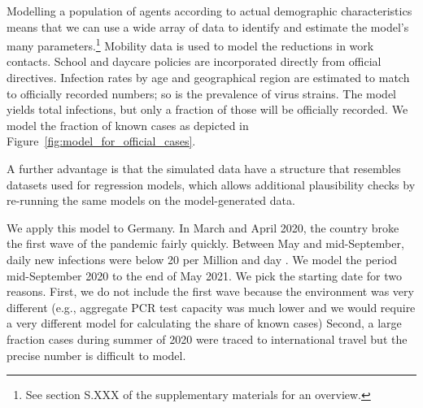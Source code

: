 Modelling a population of agents according to actual demographic characteristics means
that we can use a wide array of data to identify and estimate the model's many
parameters.\footnote{See section S.XXX of the supplementary materials for an overview.}
Mobility data is used to model the reductions in work contacts. School and daycare
policies are incorporated directly from official directives. Infection rates by age and
geographical region are estimated to match to officially recorded numbers; so is the
prevalence of virus strains. The model yields total infections, but only a fraction of
those will be officially recorded. We model the fraction of known cases as depicted in
Figure~\ref{fig:model_for_official_cases}.


A further advantage is that the simulated data have a structure that resembles datasets
used for regression models, which allows additional plausibility checks by re-running
the same models on the model-generated data.

We apply this model to Germany. In March and April 2020, the country broke the first
wave of the pandemic fairly quickly. Between May and mid-September, daily new infections
were below 20 per Million and day \citep{owidcoronavirus}. We model the period
mid-September 2020 to the end of May 2021. We pick the starting date for two reasons.
First, we do not include the first wave because the environment was very different
(e.g., aggregate PCR test capacity was much lower and we would require a very different
model for calculating the share of known cases) Second, a large fraction cases during
summer of 2020 were traced to international travel \citep{KochInstitut2021,Hodcroft2021}
but the precise number is difficult to model.

